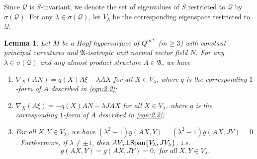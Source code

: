 \documentclass[reqno]{amsart}%
\newtheorem{lemma}[theorem]{Lemma}
\theoremstyle{definition}
\numberwithin{equation}{section}
\begin{document}
Since $\mathcal{Q}$ is $S$-invariant, we denote the set
of eigenvalues of $S$ restricted to $\mathcal{Q}$ by $\sigma(\mathcal{Q})$.
For any $\lambda\in\sigma(\mathcal{Q})$, let $V_\lambda$ be the corresponding eigenspace
restricted to $\mathcal{Q}$.


\begin{lemma}\label{lemma:5.1}
Let $M$ be a Hopf hypersurface of $Q^{m*}$ ($m\geq3$) with constant principal curvatures and $\mathfrak{A}$-isotropic unit normal vector field $N$. For any $\lambda\in\sigma(\mathcal{Q})$ and any almost product structure $A\in\mathfrak{A}$,
we have
%
\begin{enumerate}
\item[(1)]
$\nabla_X (AN)=q(X)A\xi-\lambda AX$ for all $X\in V_\lambda$, where $q$ is the corresponding $1$-form of $A$ described in \eqref{eqn:2.2};

\item[(2)]
$\nabla_X (A\xi)=-q(X)AN-\lambda JAX$ for all $X\in V_\lambda$, where $q$ is the corresponding $1$-form of $A$
described in \eqref{eqn:2.2};

\item[(3)]
For $all\  X,Y\in V_\lambda$, we have $(\lambda^2-1)g(AX,Y)=(\lambda^2-1)g(AX,JY)=0$. Furthermore,
if $\lambda\neq\pm1$, then $AV_\lambda\bot {\rm Span}\{V_\lambda, JV_\lambda\}$, i.e.
$$
g(AX,Y)=g(AX,JY)=0,\ for\ all\  X,Y\in V_\lambda.
$$
\end{enumerate}
\end{lemma}
%
\end{document}
